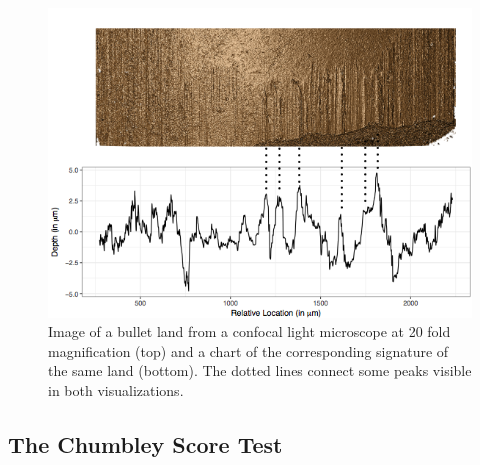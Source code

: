 \documentclass[12pt]{article}
\begin{document}
\begin{figure}
\centering
\includegraphics[width=\textwidth]{images/B6-B2-L6-rescaled.png}


\caption{\label{fig:rgl} Image of a bullet land from a confocal light microscope at 20 fold magnification (top) and a chart of the corresponding signature of the same land (bottom). The dotted lines connect some peaks visible in both visualizations.}

\end{figure}

\subsection{The Chumbley Score Test}\label{the-chumbley-score-test}
\end{document}
